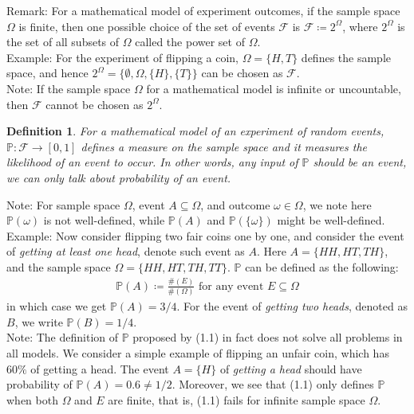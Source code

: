 \documentclass[11pt]{book}
\theoremstyle{break}
\theoremstyle{break}
\newtheorem{defn}{Definition}[corL]
\newcommand{\note}{\color{red}Note: \color{black}}
\newcommand{\remark}{\color{blue}Remark: \color{black}}
\newcommand{\example}{\color{green}Example: \color{black}}
\begin{document}
\remark For a mathematical model of experiment outcomes, if the sample space $\Omega$ is finite, then one possible choice of the set of events $\mathcal{F}$ is $\mathcal{F}\coloneqq 2^\Omega$, where $2^\Omega$ is the set of all subsets of $\Omega$ called the power set of $\Omega$.\\

\example For the experiment of flipping a coin, $\Omega = \{ H, T\}$ defines the sample space, and hence $2^\Omega = \{ \emptyset, \Omega, \{H\}, \{T\}\}$ can be chosen as $\mathcal{F}$.\\

\note If the sample space $\Omega$ for a mathematical model is infinite or uncountable, then $\mathcal{F} $ cannot be chosen as $2^\Omega$. 

\begin{defn}
For a mathematical model of an experiment of random events, $\mathbb{P}:\mathcal{F}\to [0,1]$ defines a measure on the sample space and it measures the likelihood of an event to occur. In other words, any input of $\mathbb{P}$ should be an event, we can only talk about probability of an event.
\end{defn}

\note For sample space $\Omega$, event $A \subseteq \Omega$, and outcome $\omega \in \Omega$, we note here $\mathbb{P}(\omega)$ is not well-defined, while $\mathbb{P}(A)$ and $\mathbb{P}(\{\omega\})$ might be well-defined. \\

\example Now consider flipping two fair coins one by one, and consider the event of \textit{getting at least one head}, denote such event as $A$. Here $A = \{ HH, HT, TH\}$, and the sample space $\Omega = \{ HH, HT, TH, TT\}$. $\mathbb{P}$ can be defined as the following:
\begin{align}
\mathbb{P}(A) \coloneqq \frac{\#(E)}{\#(\Omega)} \text{ for any event }E\subseteq \Omega
\end{align}
in which case we get $\mathbb{P}(A) = 3/4$. For the event of \textit{getting two heads}, denoted as $B$, we write $\mathbb{P}(B) = 1/4$. \\

\note The definition of $\mathbb{P}$ proposed by (1.1) in fact does not solve all problems in all models. We consider a simple example of flipping an unfair coin, which has $60\%$ of getting a head. The event $A = \{H\}$ of \textit{getting a head} should have probability of $\mathbb{P}(A) = 0.6 \neq 1/2$. Moreover, we see that (1.1) only defines $\mathbb{P}$ when both $\Omega$ and $E$ are finite, that is, (1.1) fails for infinite sample space $\Omega$. 
\end{document}
